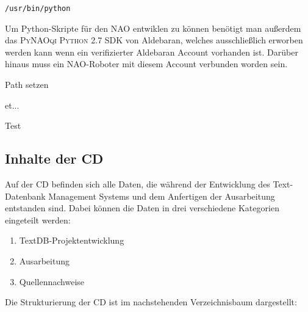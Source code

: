 \texttt{/usr/bin/python}

Um Python-Skripte für den NAO entwiklen zu können benötigt man außerdem das \textsc{PyNAOqi Python 2.7 SDK} von Aldebaran,
welches ausschließlich erworben werden kann wenn ein verifizierter Aldebaran Account vorhanden ist. Darüber hinaus muss ein NAO-Roboter mit diesem Account verbunden worden sein.

Path setzen

et...

Test


\subsection{Inhalte der CD}

Auf der CD befinden sich alle Daten, die während der Entwicklung des Text-Datenbank Management Systems und dem Anfertigen der Ausarbeitung entstanden sind. Dabei können die Daten in drei verschiedene Kategorien eingeteilt werden:
\begin{enumerate}
	\item TextDB-Projektentwicklung
	\item Ausarbeitung 
	\item Quellennachweise
\end{enumerate}

Die Strukturierung der CD ist im nachstehenden Verzeichnisbaum dargestellt:

\begin{figure}[h!]
	\centering
\end{figure}


